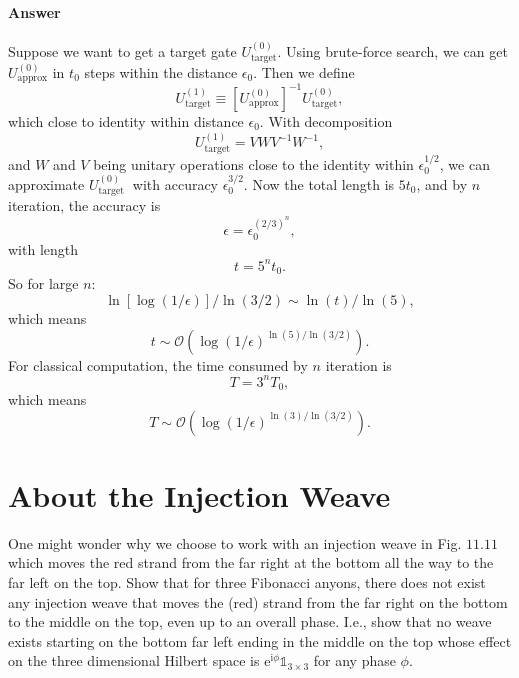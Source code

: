 \paragraph{Answer}
Suppose we want to get a target gate $U_{\text{target}}^{( 0)}$. Using brute-force search, we can get $U_{\text{approx}}^{( 0)}$ in $t_{0}$ steps within the distance $\epsilon _{0}$. Then we define
\begin{equation*}
U_{\text{target}}^{( 1)} \equiv [U_{\text{approx}}^{( 0)} ]^{-1} U_{\text{target}}^{( 0)} ,
\end{equation*}
which close to identity within distance $\epsilon _{0}$. With decomposition
\begin{equation*}
U_{\text{target}}^{( 1)} =VWV^{-1} W^{-1} ,
\end{equation*}
and $W$ and $V$ being unitary operations close to the identity within $\epsilon _{0}^{1/2}$, we can approximate $U_{\text{target }}^{(0)}$ with accuracy $\epsilon _{0}^{3/2}$. Now the total length is $5t_{0}$, and by $n$ iteration, the accuracy is
\begin{equation*}
\epsilon =\epsilon _{0}^{( 2/3)^{n}} ,
\end{equation*}
with length 
\begin{equation*}
t=5^{n} t_{0} .
\end{equation*}
So for large $n$:
\begin{equation*}
\ln [\log (1/\epsilon )]/\ln (3/2)\sim \ln (t)/\ln (5),
\end{equation*}
which means
\begin{equation*}
t\sim \mathcal{O}\left(\log (1/\epsilon )^{\ln (5)/\ln (3/2)}\right) .
\end{equation*}
For classical computation, the time consumed by $n$ iteration is
\begin{equation*}
T=3^{n} T_{0} ,
\end{equation*}
which means
\begin{equation*}
T\sim \mathcal{O}\left(\log (1/\epsilon )^{\ln (3)/\ln (3/2)}\right) .
\end{equation*}

\section{About the Injection Weave}
One might wonder why we choose to work with an injection weave in Fig. $11.11$ which moves the red strand from the far right at the bottom all the way to the far left on the top. Show that for three Fibonacci anyons, there does not exist any injection weave that moves the (red) strand from the far right on the bottom to the middle on the top, even up to an overall phase. I.e., show that no weave exists starting on the bottom far left ending in the middle on the top whose effect on the three dimensional Hilbert space is $\mathrm{e}^{\mathrm{i} \phi }\mathds{1}_{3\times 3}$ for any phase $\phi $.

